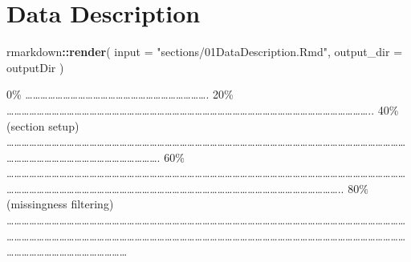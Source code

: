\documentclass[
]{article}
\newenvironment{Shaded}{\begin{snugshade}}{\end{snugshade}}
\newcommand{\AttributeTok}[1]{\textcolor[rgb]{0.13,0.29,0.53}{#1}}
\newcommand{\FunctionTok}[1]{\textcolor[rgb]{0.13,0.29,0.53}{\textbf{#1}}}
\newcommand{\NormalTok}[1]{#1}
\newcommand{\SpecialCharTok}[1]{\textcolor[rgb]{0.81,0.36,0.00}{\textbf{#1}}}
\newcommand{\StringTok}[1]{\textcolor[rgb]{0.31,0.60,0.02}{#1}}
\begin{document}
\hypertarget{data-description}{%
\section{Data Description}\label{data-description}}

\begin{Shaded}
\begin{Highlighting}[]
\NormalTok{rmarkdown}\SpecialCharTok{::}\FunctionTok{render}\NormalTok{(}
  \AttributeTok{input =} \StringTok{"sections/01DataDescription.Rmd"}\NormalTok{,}
  \AttributeTok{output\_dir =}\NormalTok{ outputDir}
\NormalTok{)}
\end{Highlighting}
\end{Shaded}

\textbar{} \textbar{} \textbar{} 0\% \textbar{}
\textbar\ldots\ldots\ldots\ldots\ldots\ldots\ldots\ldots\ldots\ldots\ldots\ldots\ldots\ldots\ldots\ldots\ldots\ldots\ldots\ldots\ldots\ldots\ldots\ldots.
\textbar{} 20\% \textbar{}
\textbar\ldots\ldots\ldots\ldots\ldots\ldots\ldots\ldots\ldots\ldots\ldots\ldots\ldots\ldots\ldots\ldots\ldots\ldots\ldots\ldots\ldots\ldots\ldots\ldots\ldots\ldots\ldots\ldots\ldots\ldots\ldots\ldots\ldots\ldots\ldots\ldots\ldots\ldots\ldots\ldots\ldots\ldots\ldots\ldots\ldots\ldots\ldots\ldots..
\textbar{} 40\% (section setup) \textbar{}
\textbar\ldots\ldots\ldots\ldots\ldots\ldots\ldots\ldots\ldots\ldots\ldots\ldots\ldots\ldots\ldots\ldots\ldots\ldots\ldots\ldots\ldots\ldots\ldots\ldots\ldots\ldots\ldots\ldots\ldots\ldots\ldots\ldots\ldots\ldots\ldots\ldots\ldots\ldots\ldots\ldots\ldots\ldots\ldots\ldots\ldots\ldots\ldots\ldots\ldots\ldots\ldots\ldots\ldots\ldots\ldots\ldots\ldots\ldots\ldots\ldots\ldots\ldots\ldots\ldots\ldots\ldots\ldots\ldots\ldots\ldots\ldots\ldots\ldots.
\textbar{} 60\% \textbar{}
\textbar\ldots\ldots\ldots\ldots\ldots\ldots\ldots\ldots\ldots\ldots\ldots\ldots\ldots\ldots\ldots\ldots\ldots\ldots\ldots\ldots\ldots\ldots\ldots\ldots\ldots\ldots\ldots\ldots\ldots\ldots\ldots\ldots\ldots\ldots\ldots\ldots\ldots\ldots\ldots\ldots\ldots\ldots\ldots\ldots\ldots\ldots\ldots\ldots\ldots\ldots\ldots\ldots\ldots\ldots\ldots\ldots\ldots\ldots\ldots\ldots\ldots\ldots\ldots\ldots\ldots\ldots\ldots\ldots\ldots\ldots\ldots\ldots\ldots\ldots\ldots\ldots\ldots\ldots\ldots\ldots\ldots\ldots\ldots\ldots\ldots\ldots\ldots\ldots\ldots\ldots\ldots\ldots\ldots\ldots\ldots\ldots\ldots..
\textbar{} 80\% (missingness filtering) \textbar{}
\textbar\ldots\ldots\ldots\ldots\ldots\ldots\ldots\ldots\ldots\ldots\ldots\ldots\ldots\ldots\ldots\ldots\ldots\ldots\ldots\ldots\ldots\ldots\ldots\ldots\ldots\ldots\ldots\ldots\ldots\ldots\ldots\ldots\ldots\ldots\ldots\ldots\ldots\ldots\ldots\ldots\ldots\ldots\ldots\ldots\ldots\ldots\ldots\ldots\ldots\ldots\ldots\ldots\ldots\ldots\ldots\ldots\ldots\ldots\ldots\ldots\ldots\ldots\ldots\ldots\ldots\ldots\ldots\ldots\ldots\ldots\ldots\ldots\ldots\ldots\ldots\ldots\ldots\ldots\ldots\ldots\ldots\ldots\ldots\ldots\ldots\ldots\ldots\ldots\ldots\ldots\ldots\ldots\ldots\ldots\ldots\ldots\ldots\ldots\ldots\ldots\ldots\ldots\ldots\ldots\ldots\ldots\ldots\ldots\ldots\ldots\ldots\ldots\ldots\ldots\ldots\ldots\ldots\ldots\ldots\ldots\ldots\ldots\textbar{}
\end{document}
